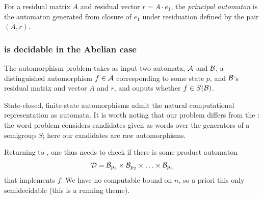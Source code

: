 \documentclass[11pt, titlepage]{article}
\begin{document}
\begin{example}
\begin{center}
\end{center}
\end{example}

\begin{definition}
  For a residual matrix $A$ and residual vector $r = A \cdot e_1$, the
  \emph{principal automaton} is the automaton generated from closure
  of $e_1$ under residuation defined by the pair $(A, r)$.
\end{definition}

\subsubsection{ is decidable in the Abelian case}

\begin{definition}
  The automorphism  problem takes as input two
  automata, $\mathcal{A}$ and $\mathcal{B}$, a distinguished automorphism $f \in \mathcal{A}$
  corresponding to some state $p$, and $\mathcal{B}$'s residual matrix and
  vector $A$ and $r$, and ouputs whether $f \in S(\mathcal{B})$.
\end{definition}

State-closed, finite-state automorphisms admit the natural
computational representation as automata. It is worth noting that our
 problem differs from the :
the word problem considers candidates given as words over the
generators of a semigroup $S$; here our candidates are raw
automorphisms.

Returning to , one thus needs to check if there is
some product automaton
\[
  \mathcal{D} = \mathcal{B}_{p_1} \times \mathcal{B}_{p_2} \times \ldots \times \mathcal{B}_{p_n}
\]
that implements $f$. We have no computable bound on $n$, so a priori
this only semidecidable (this is a running theme).
\end{document}
